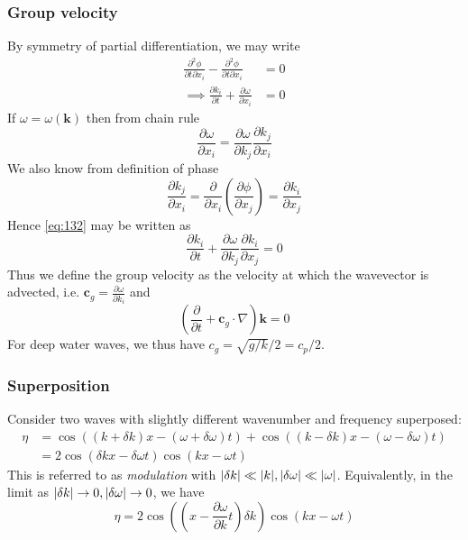 \documentclass{jknotes}
\begin{document}
\subsubsection{Group velocity}
By symmetry of partial differentiation, we may write
\begin{align}
	\frac{\partial^2 \phi}{\partial t \partial x_i} - 
	\frac{\partial^2 \phi}{\partial t \partial x_i} &= 0 \\
	\implies \frac{\partial k_i}{\partial t} + \frac{\partial \omega}{\partial
x_i} &= 0 \label{eq:132}
\end{align}
If $\omega = \omega(\symbf{k})$ then from chain rule
\begin{equation}
	\frac{\partial \omega}{\partial x_i} = \frac{\partial \omega}{\partial
	k_j} \frac{\partial k_j}{\partial x_i}
\end{equation}
We also know from definition of phase
\begin{equation}
	\frac{\partial k_j}{\partial x_i} = \frac{\partial}{\partial x_i} \left(
	\frac{\partial \phi}{\partial x_j} \right) = \frac{\partial k_i}{\partial
	x_j}
\end{equation}
Hence  \eqref{eq:132} may be written as
\begin{equation}
	\frac{\partial k_i}{\partial t} + \frac{\partial \omega}{\partial k_j}
	\frac{\partial k_i}{\partial x_j} = 0
\end{equation}
Thus we define the group velocity as the velocity at which the wavevector is
advected, i.e. $\symbf{c}_g = \frac{\partial \omega}{\partial k_i}$ and
\begin{equation}
	\left( \frac{\partial}{\partial t} + \symbf{c}_g \cdot \nabla \right)
	\symbf{k} = 0
\end{equation}
For deep water waves, we thus have $c_g = \sqrt{g/k}/2 = c_p/2$.
\subsubsection{Superposition}
Consider two waves with slightly different wavenumber and frequency
superposed:
\begin{align}
	\eta &= \cos \left( (k+\delta k)x - (\omega+\delta \omega)t\right) + \cos
	\left( (k-\delta k)x - (\omega - \delta\omega)t\right) \\
		 &= 2 \cos \left( \delta k x - \delta \omega t\right) \cos \left( kx -
		 \omega t\right)
\end{align}
This is referred to as \emph{modulation} with $\abs{\delta k} \ll \abs{k},
\abs{\delta \omega} \ll \abs{\omega}$. Equivalently, in the limit as
$\abs{\delta k} \to 0, \abs{\delta \omega} \to 0$, we have
\begin{equation}
	\eta = 2 \cos \left( (x-\frac{\partial \omega}{\partial k} t)\delta
	k\right)
	\cos \left( kx - \omega t \right)
\end{equation}
\end{document}

